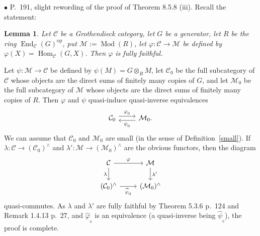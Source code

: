 \documentclass[12pt]{article}
\newtheorem{lem}[thm]{Lemma}
\theoremstyle{remark}%
\newcommand{\bu}{\bullet}
\newcommand{\n}{\noindent}
\newcommand{\C}{\mathcal C}
\newcommand{\M}{\mathcal M}
\newcommand{\p}{\varphi}
\newcommand{\pf}{\n{\em Proof. }}
\DeclareMathOperator{\h}{Hom}
\DeclareMathOperator{\Mod}{Mod}
\DeclareMathOperator{\op}{op}
\begin{document}

\n$\bu$ P.~191, slight rewording of the proof of Theorem 8.5.8 (iii). Recall the statement: 
%
\begin{lem}\label{858iii}
%
Let $\C$ be a Grothendieck category, let $G$ be a generator, let $R$ be the ring $\operatorname{End}_\C(G)^{\op}$, put $\M:=\Mod(R)$, let $\p:\C\to\M$ be defined by $\p(X)=\h_\C(G,X)$. Then $\p$ is fully faithful. 
%
\end{lem}
%
\pf Let $\psi:\M\to\C$ be defined by $\psi(M)=G\otimes_RM$, let $\C_0$ be the full subcategory of $\C$ whose objects are the direct sums of finitely many copies of $G$, and let $\M_0$ be the full subcategory of $\M$ whose objects are the direct sums of finitely many copies of $R$. Then $\p$ and $\psi$ quasi-induce quasi-inverse equivalences 
$$
\begin{tikzcd}
\C_0\ar[yshift=.7ex]{r}{\p_{{}_0}}&\M_0.\ar[yshift=-.7ex]{l}{\psi_{{}_0}}
\end{tikzcd}
$$ 
We can assume that $\C_0$ and $\M_0$ are small (in the sense of Definition~\ref{small}). If $\lambda:\C\to(\C_0)^\wedge$ and $\lambda':\M\to(\M_0)^\wedge$ are the obvious functors, then the diagram 
$$
\begin{tikzcd}
\C\ar{r}{\p}\ar{d}[swap]{\lambda}&\M\ar{d}{\lambda'}\\
(\C_0)^\wedge\ar{r}[swap]{\widehat\p_{{}_0}}&(\M_0)^\wedge
\end{tikzcd}
$$ 
quasi-commutes. As $\lambda$ and $\lambda'$ are fully faithful by Theorem 5.3.6 p.~124 and Remark 1.4.13 p.~27, and $\widehat\p_{{}_0}$ is an equivalence (a quasi-inverse being $\widehat\psi_{{}_0}$), the proof is complete. 

\end{document}

